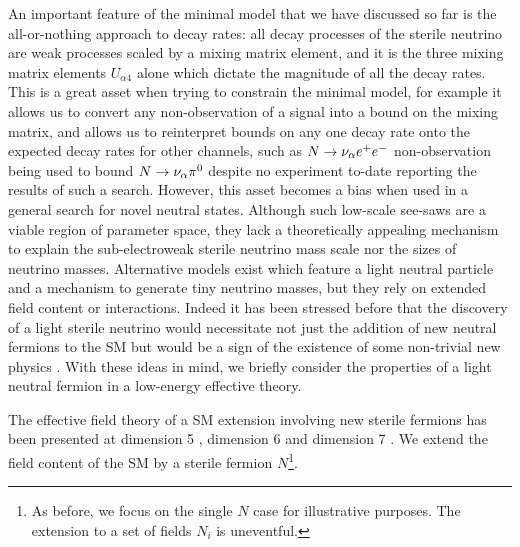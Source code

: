 \documentclass[11pt, a4paper]{article}
\def\ster{\ensuremath N}
\begin{document}
An important feature of the minimal model that we have discussed so far is the
all-or-nothing approach to decay rates: all decay processes of the sterile
neutrino are weak processes scaled by a mixing matrix element, and it is the
three mixing matrix elements $U_{\alpha 4}$ alone which dictate the magnitude
of all the decay rates. This is a great asset when trying to constrain the
minimal model, for example it allows us to convert any non-observation of a
signal into a bound on the mixing matrix, and allows us to reinterpret bounds
on any one decay rate onto the expected decay rates for other channels, such as
$\ster \rightarrow \nu_\alpha e^+ e^-$ non-observation being used to bound
$\ster \rightarrow \nu_\alpha \pi^0$ despite no experiment to-date reporting
the results of such a search. 
%
However, this asset becomes a bias when used in a general search for novel
neutral states. Although such low-scale see-saws are a viable region of
parameter space, they lack a theoretically appealing mechanism to explain the
sub-electroweak sterile neutrino mass scale nor the sizes of neutrino masses.
Alternative models exist which feature a light neutral particle and a mechanism
to generate tiny neutrino masses, but they rely on extended field content or
interactions.
%
Indeed it has been stressed before that the discovery of a light sterile
neutrino would necessitate not just the addition of new neutral fermions to the
SM but would be a sign of the existence of some non-trivial new physics
\cite{delAguila:2008ir}. With these ideas in mind, we briefly consider the
properties of a light neutral fermion in a low-energy effective theory.  

The effective field theory of a SM extension involving new sterile fermions has
been presented at dimension 5 \cite{delAguila:2008ir,Aparici:2009fh}, dimension
6 \cite{delAguila:2008ir} and dimension 7 \cite{Bhattacharya:2015vja}.
%
We extend the field content of the SM by a sterile fermion $N$\footnote{As
before, we focus on the single $N$ case for illustrative purposes. The
extension to a set of fields $N_i$ is uneventful.}.  
\end{document}
